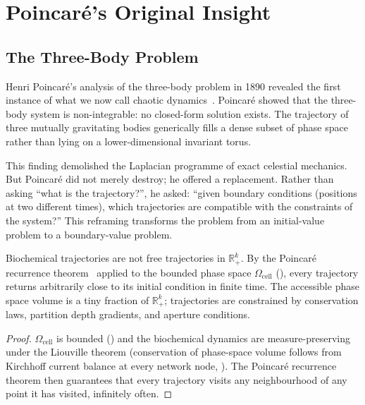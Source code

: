 \section{Poincaré's Original Insight}
\label{sec:poincare-insight}

\subsection{The Three-Body Problem}

Henri Poincaré's analysis of the three-body problem in 1890 revealed the
first instance of what we now call chaotic dynamics~\citep{poincare1890probleme}.
Poincaré showed that the three-body system is non-integrable: no closed-form
solution exists.  The trajectory of three mutually gravitating bodies
generically fills a dense subset of phase space rather than lying on a
lower-dimensional invariant torus.

This finding demolished the Laplacian programme of exact celestial mechanics.
But Poincaré did not merely destroy; he offered a replacement.  Rather than
asking ``what is the trajectory?'', he asked: ``given boundary conditions
(positions at two different times), which trajectories are compatible with the
constraints of the system?''  This reframing transforms the problem from an
initial-value problem to a boundary-value problem.

\begin{proposition}
\label{prop:poincare}
Biochemical trajectories are not free trajectories in $\mathbb{R}^k_+$.  By
the Poincaré recurrence theorem~\citep{poincare1890probleme} applied to the
bounded phase space $\Omega_\mathrm{cell}$ (), every
trajectory returns arbitrarily close to its initial condition in finite time.
The accessible phase space volume is a tiny fraction of $\mathbb{R}^k_+$;
trajectories are constrained by conservation laws, partition depth gradients,
and aperture conditions.
\end{proposition}

\begin{proof}
$\Omega_\mathrm{cell}$ is bounded () and the biochemical
dynamics are measure-preserving under the Liouville theorem (conservation of
phase-space volume follows from Kirchhoff current balance at every network
node, ).  The Poincaré recurrence theorem then guarantees that
every trajectory visits any neighbourhood of any point it has visited, infinitely
often.
\end{proof}

